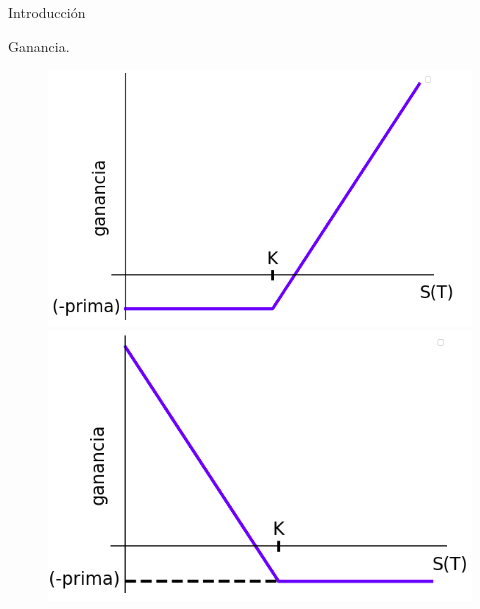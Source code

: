 \documentclass{beamer}
\begin{document}
\begin{frame}{Introducci\'on}

    \begin{block}{Ganancia.}

    \begin{figure}[]
       \centering
       \begin{minipage}[b]{0.45\textwidth}
        \includegraphics[width=1\textwidth]{callganancia.png}  
       \end{minipage}
       \hfill
       \begin{minipage}[b]{0.45\textwidth}
        \includegraphics[width=1\textwidth]{putganancia.png}
      \end{minipage}
      \label{longganancia}
    \end{figure}



\end{block}
\end{frame}
\end{document}
